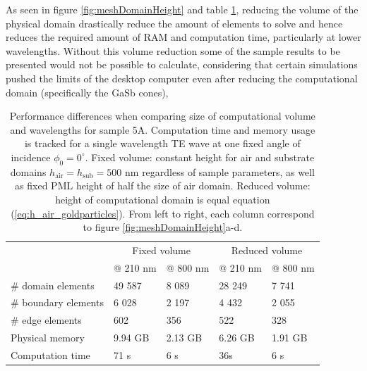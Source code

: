 As seen in figure \ref{fig:meshDomainHeight} and table \ref{tab:domainHeight}, reducing the volume of the physical domain drastically reduce the amount of elements to solve and hence reduces the required amount of RAM and computation time, particularly at lower wavelengths. Without this volume reduction some of the sample results to be presented would not be possible to calculate, considering that certain simulations pushed the limits of the desktop computer even after reducing the computational domain (specifically the GaSb cones), 

 \begin{table}[htb!]
    \centering
    \caption{Performance differences when comparing size of computational volume and wavelengths for sample 5A. Computation time and memory usage is tracked for a single wavelength TE wave at one fixed angle of incidence $\phi_0=0^\circ$. Fixed volume: constant height for air and substrate domains $h_{\text{air}}=h_{\text{sub}}=500$ nm regardless of sample parameters, as well as fixed PML height of half the size of air domain. Reduced volume: height of computational domain is equal equation (\ref{eq:h_air_goldparticles}). From left to right, each column correspond to figure \ref{fig:meshDomainHeight}a-d.}
    \label{tab:domainHeight}
    \begin{tabular}{l l l l l}
    & \multicolumn{2}{c}{Fixed volume} & \multicolumn{2}{c}{Reduced volume} \\
            &   @ 210 nm    &  @ 800 nm    &  @ 210 nm        & @ 800 nm \\
    \hline 
    $\#$ domain elements    &   49 587      &   8 089       &   28 249      &   7 741\\
    $\#$ boundary elements  &   6 028       &   2 197       &   4 432       &   2 055\\
    $\#$ edge elements      &   602         &   356         &   522         &   328\\
    Physical memory         &   9.94 GB      &   2.13 GB      &   6.26 GB      &   1.91 GB\\
    Computation time        &   71 s    &   6 s          &   36s          &   6 s\\ %
    \hline
    \end{tabular}
\end{table}


